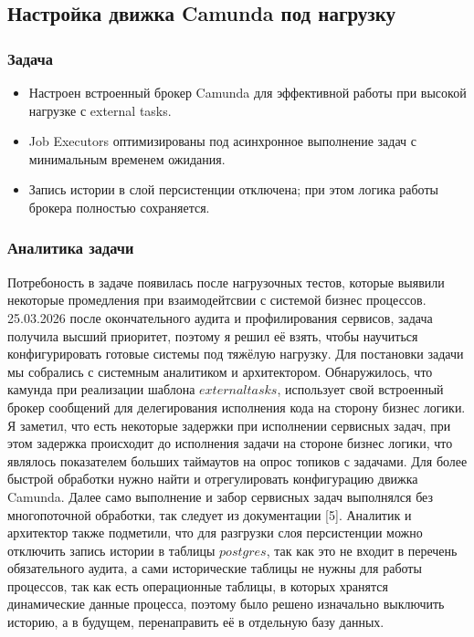 \subsection{Настройка движка Camunda под нагрузку}

\subsubsection{Задача}
\begin{itemize}
  \item Настроен встроенный брокер Camunda для эффективной работы при высокой нагрузке с external tasks.
  \item Job Executors оптимизированы под асинхронное выполнение задач с минимальным временем ожидания.
  \item Запись истории в слой персистенции отключена; при этом логика работы брокера полностью сохраняется.
\end{itemize}

\subsubsection{Аналитика задачи}

Потребоность в задаче появилась после нагрузочных тестов, которые выявили некоторые промедления при взаимодейтсвии с системой бизнес процессов.
25.03.2026 после окончательного аудита и профилирования сервисов, задача получила высший приоритет, поэтому я решил её взять, чтобы научиться конфигурировать
готовые системы под тяжёлую нагрузку. Для постановки задачи мы собрались с системным аналитиком и архитектором.
Обнаружилось, что камунда при реализации шаблона $external tasks$, использует свой встроенный брокер сообщений для делегирования исполнения кода на сторону бизнес логики.
Я заметил, что есть некоторые задержки при исполнении сервисных задач, при этом задержка происходит до исполнения задачи на стороне бизнес логики, что являлось показателем больших таймаутов на опрос топиков с задачами.
Для более быстрой обработки нужно найти и отрегулировать конфигурацию движка Camunda. Далее само выполнение и забор сервисных задач выполнялся без многопоточной обработки, так следует из документации [5].
Аналитик и архитектор также подметили, что для разгрузки слоя персистенции можно отключить запись истории в таблицы $postgres$, так как это не входит в перечень обязательного аудита, а сами исторические таблицы не нужны для работы процессов, так как есть операционные таблицы, в которых хранятся динамические данные процесса, поэтому было решено изначально выключить историю, а в будущем, перенаправить её в отдельную базу данных.

